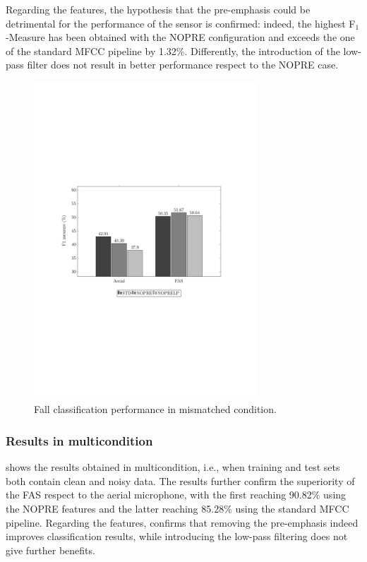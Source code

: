Regarding the features, the hypothesis that the pre-emphasis could be detrimental for the performance of the sensor is confirmed: indeed, the highest F$_1$-Measure has been obtained with the NOPRE configuration and exceeds the one of the standard MFCC pipeline by 1.32\%. Differently, the introduction of the low-pass filter does not result in better performance respect to the NOPRE case. %

\begin{figure}[t]
	\centering
	\includegraphics[width=0.75\textwidth]{img/pgfsources/16_mismatched/16_mismatched}
	\caption{Fall classification performance in mismatched condition.} \label{fig:results_mismatch}
\end{figure}

\subsubsection{Results in multicondition}
 shows the results obtained in multicondition, i.e., when training and test sets both contain clean and noisy data. The results further confirm the superiority of the FAS respect to the aerial microphone, with the first reaching 90.82\% using the NOPRE features and the latter reaching 85.28\% using the standard MFCC pipeline. Regarding the features,  confirms that removing the pre-emphasis indeed improves classification results, while introducing the low-pass filtering does not give further benefits.

